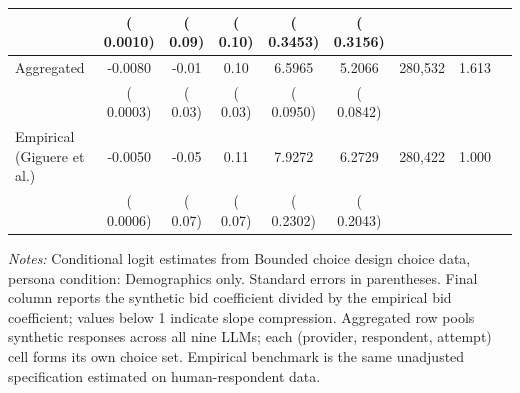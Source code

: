 \begin{table}[h]
\begin{threeparttable}
\begin{tabular}{lcccccccr}
 & (   0.0010) & (     0.09) & (     0.10) & (   0.3453) & (   0.3156) & & \\
\midrule
Aggregated &   -0.0080 &     -0.01 &      0.10 &    6.5965 &    5.2066 &   280,532 &  1.613 \\
 & (   0.0003) & (     0.03) & (     0.03) & (   0.0950) & (   0.0842) & & \\
\midrule
Empirical (Giguere et al.) &   -0.0050 &     -0.05 &      0.11 &    7.9272 &    6.2729 &   280,422 & 1.000 \\
 & (   0.0006) & (     0.07) & (     0.07) & (   0.2302) & (   0.2043) & & \\
\bottomrule
\end{tabular}
\begin{tablenotes}\footnotesize
\item \textit{Notes:} Conditional logit estimates from Bounded choice design choice data, persona condition: Demographics only. 
Standard errors in parentheses. 
Final column reports the synthetic bid coefficient divided by the empirical bid coefficient; values below 1 indicate slope compression. 
Aggregated row pools synthetic responses across all nine LLMs; each (provider, respondent, attempt) cell forms its own choice set. 
Empirical benchmark is the same unadjusted specification estimated on \textcite{Giguere2020} human-respondent data.
\end{tablenotes}
\end{threeparttable}
\end{table}
